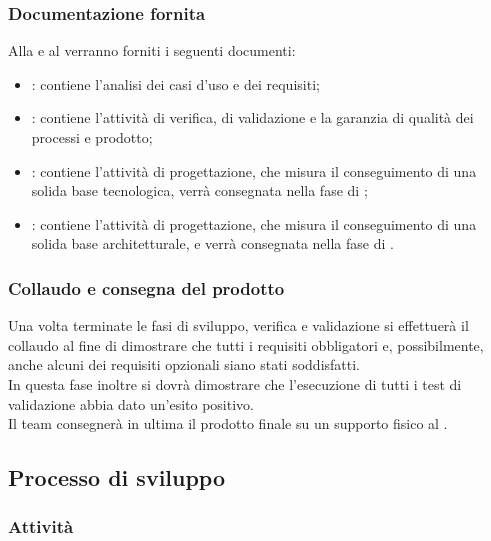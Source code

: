 \subsubsection{Documentazione fornita}
Alla \proponente{} e al \committenti{} verranno forniti i seguenti documenti:
\begin{itemize}
	\item \textbf{\AdR}: contiene l'analisi dei casi d'uso e dei requisiti;
	\item \textbf{\PdQ}: contiene l'attività di verifica, di validazione e la garanzia di qualità dei processi e prodotto;
	\item \textbf{\ST}: contiene l'attività di progettazione, che misura il conseguimento di una solida base tecnologica, verrà consegnata nella fase di \RP;
	\item \textbf{\DdP}: contiene l'attività di progettazione, che misura il conseguimento di una solida base architetturale, e verrà consegnata nella fase di \RQ.
\end{itemize}

\subsubsection{Collaudo e consegna del prodotto}
Una volta terminate le fasi di sviluppo, verifica e validazione si effettuerà il collaudo al fine di dimostrare che tutti i requisiti obbligatori e, possibilmente, anche alcuni dei requisiti opzionali siano stati soddisfatti. 
\\In questa fase inoltre si dovrà dimostrare che l'esecuzione di tutti i test di validazione abbia dato un'esito positivo.
\\Il team consegnerà in ultima il prodotto finale su un supporto fisico al \committenti.

\subsection{Processo di sviluppo}
\subsubsection{Attività}
